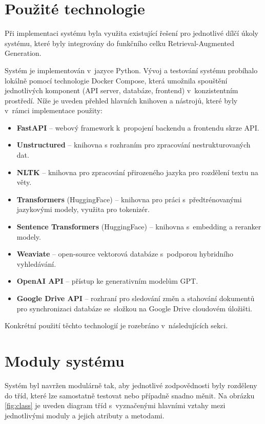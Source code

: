 \section{Použité technologie}
Při implementaci systému byla využita existující řešení pro jednotlivé dílčí úkoly systému, které byly integrovány do funkčního celku Retrieval-Augmented Generation. 

Systém je implementován v~jazyce Python. Vývoj a testování systému probíhalo lokálně pomocí technologie Docker Compose, která umožnila spouštění jednotlivých komponent (API server, databáze, frontend) v~konzistentním prostředí. Níže je uveden přehled hlavních knihoven a nástrojů, které byly v~rámci implementace použity:
\begin{itemize}
    \item \textbf{FastAPI} – webový framework k~propojení backendu a frontendu skrze API.
    \item \textbf{Unstructured} – knihovna s rozhraním pro zpracování nestrukturovaných dat.
    \item \textbf{NLTK} – knihovna pro zpracování přirozeného jazyka pro rozdělení textu na věty.
    \item \textbf{Transformers} (HuggingFace) – knihovna pro práci s~předtrénovanými jazykovými modely, využita pro tokenizér. 
    \item \textbf{Sentence Transformers} (HuggingFace) – knihovna s~embedding a reranker modely.
    \item \textbf{Weaviate} – open-source vektorová databáze s~podporou hybridního vyhledávání.
    \item \textbf{OpenAI API} – přístup ke generativním modelům GPT.
    \item \textbf{Google Drive API} – rozhraní pro sledování změn a stahování dokumentů pro synchronizaci databáze se~složkou na Google Drive cloudovém úložišti.
\end{itemize}

Konkrétní použití těchto technologií je rozebráno v~následujících sekci.

\section{Moduly systému}
Systém byl navržen modulárně tak, aby jednotlivé zodpovědnosti byly rozděleny do tříd, které lze samostatně testovat nebo případně snadno měnit. Na obrázku \ref{fig:class} je uveden diagram tříd s~vyznačenými hlavními vztahy mezi jednotlivými moduly a jejich atributy a metodami.

